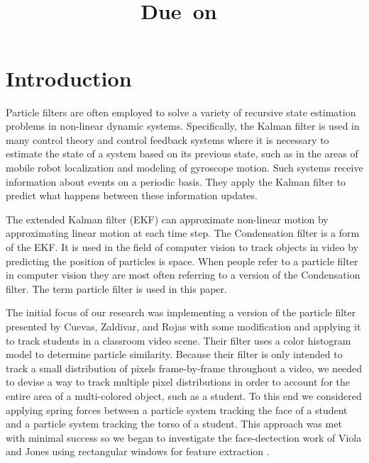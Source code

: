 \documentclass[11pt]{article}
\title{
  \vspace{2in}
  \textmd{\textbf{\hmwkTitle}} \\
  \vspace{0.1in}
  \large{\textmd{\hmwkClassInstructor}} \\
  \vspace{0.1in}
  \normalsize\small{Due\ on\ \hmwkDueDate} \\
  \vspace{3in}
}
\date{} %
\author{\textbf{\hmwkAuthorName}}
\begin{document}
\maketitle
\thispagestyle{empty}

\newpage %

\section{Introduction}

Particle filters are often employed to solve a variety of recursive state estimation problems in non-linear dynamic systems. Specifically, the Kalman filter is used in many control theory and control feedback systems where it is necessary to estimate the state of a system based on its previous state, such as in the areas of mobile robot localization and modeling of gyroscope motion. Such systems receive information about events on a periodic basis. They apply the Kalman filter to predict what happens between these information updates.

The extended Kalman filter (EKF) can approximate non-linear motion by approximating linear motion at each time step. The Condensation filter is a form of the EKF. It is used in the field of computer vision to track objects in video by predicting the position of particles is space. When people refer to a particle filter in computer vision they are most often referring to a version of the Condensation filter. The term particle filter is used in this paper.

The initial focus of our research was implementing a version of the particle filter presented by Cuevas,  Zaldivar, and Rojas \cite{particle} with some modification and applying it to track students in a classroom video scene. Their filter uses a color histogram model to determine particle similarity. Because their filter is only intended to track a small distribution of pixels frame-by-frame throughout a video, we needed to devise a way to track multiple pixel distributions in order to account for the entire area of a multi-colored object, such as a student. To this end we considered applying spring forces between a particle system tracking the face of a student and a particle system tracking the torso of a student. This approach was met with minimal success so we began to investigate the face-dectection work of Viola and Jones using rectangular windows for feature extraction \cite{facedetection}.
\end{document}
